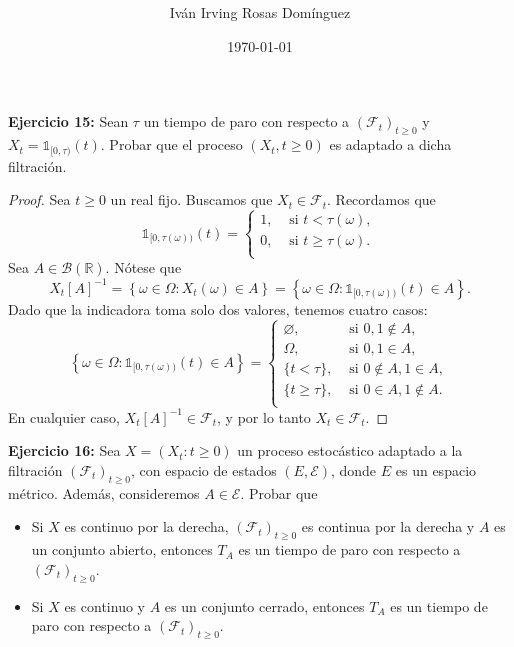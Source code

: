 \documentclass[letterpaper]{article}
\title{\textbf{}}
\author{Iván Irving Rosas Domínguez}
\date{\today}
\newcommand{\R}{\mathbb{R}}
\newcommand{\F}{\mathcal{F}}
\newcommand{\B}{\mathcal{B}}
\newcommand{\1}{\mathds{1}}
\theoremstyle{definition}
\theoremstyle{definition}
\theoremstyle{definition}
\theoremstyle{definition}
\theoremstyle{definition}
\begin{document}
\maketitle


\noindent\textbf{Ejercicio 15:} Sean $\tau$ un tiempo de paro con respecto a $(\F_t)_{t\geq0}$ y $X_t=\1_{[0,\tau)}(t)$. Probar que 
    el proceso $(X_t,t\geq0)$ es adaptado a dicha filtración.
    \begin{proof} Sea $t\geq0$ un real fijo. Buscamos que $X_t\in \F_t$. Recordamos que 
      \[
        \1_{[0,\tau(\omega))}(t)=\begin{cases}
            1, & \text{ si } t< \tau(\omega),\\
            0, & \text{ si } t\geq \tau(\omega).\\
        \end{cases}
      \] 
    Sea $A\in \B(\R)$. Nótese que  
    \[
    X_t[A]^{-1}=\left\{\omega \in \Omega : X_t(\omega) \in A\right\}=\left\{\omega \in \Omega : \1_{[0,\tau(\omega))}(t)\in A\right\}. 
    \]
    Dado que la indicadora toma solo dos valores, tenemos cuatro casos:
    \[
        \left\{\omega \in \Omega : \1_{[0,\tau(\omega))}(t)\in A\right\}=\begin{cases}
            \varnothing, & \text{ si } 0, 1\not \in A,\\
            \Omega, & \text{ si } 0,1 \in A,\\
            \{t<\tau\}, & \text{ si } 0\not\in A, 1 \in A,\\
            \{t\geq\tau\}, & \text{ si } 0 \in A, 1\not \in A.\\
        \end{cases}
    \]
    En cualquier caso, $X_t[A]^{-1}\in\F_t$, y por lo tanto $X_t\in \F_t$.
     \end{proof}  
\noindent \textbf{Ejercicio 16:} Sea $X=(X_t:t\geq0)$ un proceso estocástico adaptado a la filtración $(\F_t)_{t\geq0}$, con espacio de estados $(E,\mathcal{E})$, donde 
$E$ es un espacio métrico. Además, consideremos $A\in \mathcal{E}$. Probar que 
\begin{itemize}
  \item Si $X$ es continuo por la derecha, $(\F_t)_{t\geq0}$ es continua por la derecha y $A$ es un conjunto abierto, entonces $T_A$ es un tiempo de paro con respecto a $(\F_t)_{t\geq0}$.
  \item Si $X$ es continuo y $A$ es un conjunto cerrado, entonces $T_A$ es un tiempo de paro con respecto a $(\F_t)_{t\geq0}$.
\end{itemize}
\end{document}
